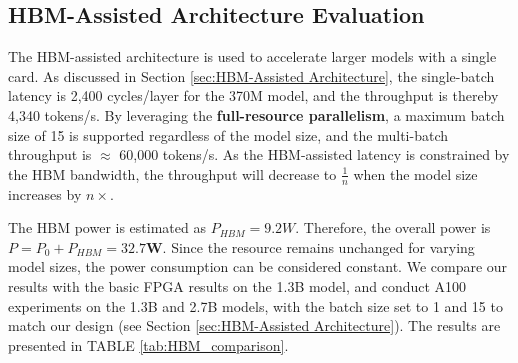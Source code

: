 \subsection{HBM-Assisted Architecture Evaluation}
The HBM-assisted architecture is used to accelerate larger models with a single card. As discussed in Section \ref{sec:HBM-Assisted Architecture}, the single-batch latency is 2,400 cycles/layer for the 370M model, and the throughput is thereby 4,340 tokens/s. By leveraging the \textbf{full-resource parallelism}, a maximum batch size of 15 is supported regardless of the model size, and the multi-batch throughput is $\approx$ 60,000 tokens/s. As the HBM-assisted latency is constrained by the HBM bandwidth, the throughput will decrease to $\frac{1}{n}$ when the model size increases by $n\times$. 

The HBM power is estimated as $P_{HBM}=9.2W$. Therefore, the overall power  is $P=P_0+P_{HBM}=\mathbf{32.7W}$. Since the resource remains unchanged for varying model sizes, the power consumption can be considered constant. We compare our results with the basic FPGA results\cite{scalable} on the 1.3B model, and conduct A100 experiments on the 1.3B and 2.7B models, with the batch size set to 1 and 15 to match our design (see Section \ref{sec:HBM-Assisted Architecture}). The results are presented in TABLE \ref{tab:HBM_comparison}. 

